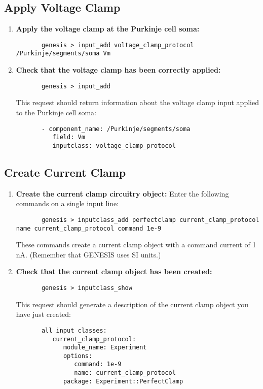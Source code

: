 \documentclass[12pt]{article}
\begin{document}
\subsection*{Apply Voltage Clamp}

\begin{enumerate}
	\item{\bf Apply the voltage clamp at the Purkinje cell soma:}
	\begin{verbatim}
	   genesis > input_add voltage_clamp_protocol /Purkinje/segments/soma Vm
	\end{verbatim}
	
	\item{\bf Check that the voltage clamp has been correctly applied:}
	\begin{verbatim}
	   genesis > input_add
	\end{verbatim}
	This request should return information about the voltage clamp input applied to the Purkinje cell soma:
	\begin{verbatim}
	   - component_name: /Purkinje/segments/soma
	      field: Vm
	      inputclass: voltage_clamp_protocol
	   \end{verbatim}
\end{enumerate}

\subsection*{Create Current Clamp}

\begin{enumerate}
	\item{\bf Create the current clamp circuitry object:} Enter the following commands on a single input line:
	\begin{verbatim}
	   genesis > inputclass_add perfectclamp current_clamp_protocol name current_clamp_protocol command 1e-9
	\end{verbatim}
	These commands create a current clamp object with a command current of 1\,nA. (Remember that GENESIS uses SI units.)
	
	\item{\bf Check that the current clamp object has been created:}
	\begin{verbatim}
	   genesis > inputclass_show
	\end{verbatim}
	This request should generate a description of the current clamp object you have just created:
	\begin{verbatim}
	   all input classes: 
	      current_clamp_protocol:
	         module_name: Experiment
	         options:
	            command: 1e-9
	            name: current_clamp_protocol
	         package: Experiment::PerfectClamp
	\end{verbatim}
\end{enumerate}
\end{document}
